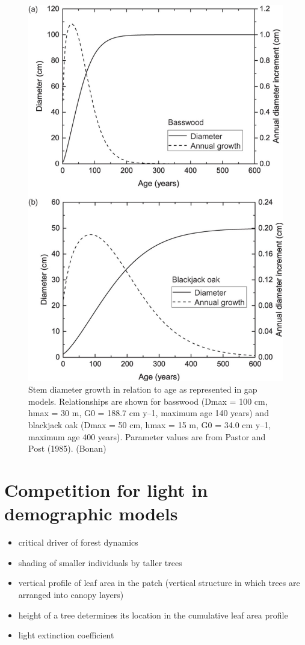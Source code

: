 \documentclass[
  12pt,
  oneside]{book}
\providecommand{\tightlist}{%
  \setlength{\itemsep}{0pt}\setlength{\parskip}{0pt}}
\begin{document}
\begin{figure}

{\centering \includegraphics[width=0.8\linewidth]{figures/chap6/f626_growth strategies} 

}

\caption{Stem diameter growth in relation to age as represented in gap models. Relationships are shown for basswood (Dmax = 100 cm, hmax = 30 m, G0 = 188.7 cm y–1, maximum age 140 years) and blackjack oak (Dmax = 50 cm, hmax = 15 m, G0 = 34.0 cm y–1, maximum age 400 years). Parameter values are from Pastor and Post (1985). (Bonan)}\label{fig:f626}
\end{figure}

\hypertarget{competition-for-light-in-demographic-models}{%
\section{Competition for light in demographic models}\label{competition-for-light-in-demographic-models}}

\begin{itemize}
\tightlist
\item
  critical driver of forest dynamics
\item
  shading of smaller individuals by taller trees
\item
  vertical profile of leaf area in the patch (vertical structure in which trees are arranged into canopy layers)
\item
  height of a tree determines its location in the cumulative leaf area profile
\item
  light extinction coefficient
\end{itemize}
\end{document}
